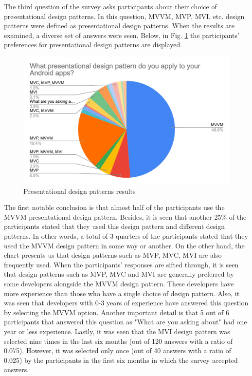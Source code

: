 The third question of the survey asks participants about their choice of presentational design patterns. In this question, MVVM, MVP, MVI, etc. design patterns were defined as presentational design patterns. When the results are  examined, a diverse set of answers were seen. Below, in Fig. \ref{fig:design_pattern} the participants' preferences for presentational design patterns are displayed.
\begin{figure}[ht!]
    \centering
    \includegraphics[scale=0.3]{figures/survey_q3_design_pattern.png}
    \caption{Presentational design patterns results}
    \label{fig:design_pattern}
\end{figure}
\FloatBarrier
The first notable conclusion is that almost half of the participants use the MVVM presentational design pattern. Besides, it is seen that another 25\% of the participants stated that they used this design pattern and different design patterns. In other words, a total of 3 quarters of the participants stated that they used the MVVM design pattern in some way or another. On the other hand, the chart presents us that design patterns such as MVP, MVC, MVI are also frequently used. When the participants' responses are sifted through, it is seen that design patterns such as MVP, MVC and MVI are generally preferred by some developers alongside the MVVM design pattern. These developers have more experience than those who have a single choice of design pattern. Also, it was seen that developers with 0-3 years of experience have answered this question by selecting the MVVM option. Another important detail is that 5 out of 6 participants that answered this question as "What are you asking about" had one year or less experience. Lastly, it was seen that the MVI design pattern was selected nine times in the last six months (out of 120 answers with a ratio of 0.075). However, it was selected only once (out of 40 answers with a ratio of 0.025) by the participants in the first six months in which the survey accepted answers.

